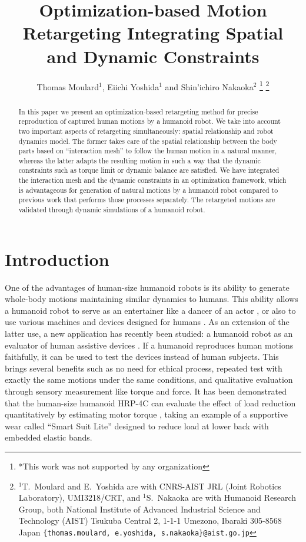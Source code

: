 \documentclass[letterpaper, 10 pt, conference]{ieeeconf}  %
\title{\LARGE \bf
Optimization-based Motion Retargeting Integrating Spatial and Dynamic Constraints
}
\author{Thomas Moulard$^{1}$, Eiichi Yoshida$^{1}$ and Shin'ichiro
  Nakaoka$^{2}$%
\thanks{*This work was not supported by any organization}%
\thanks{$^{1}$T.~Moulard and E.~Yoshida are with CNRS-AIST JRL (Joint
  Robotics Laboratory), UMI3218/CRT, and $^{1}$S.~Nakaoka are with
  Humanoid Research Group, both National Institute of Advanced Industrial Science and Technology (AIST)
Tsukuba Central 2, 1-1-1 Umezono, Ibaraki 305-8568 Japan
        {\tt\footnotesize \{thomas.moulard, e.yoshida, s.nakaoka\}@aist.go.jp}}%
}
\begin{document}
\maketitle
\thispagestyle{empty}
\pagestyle{empty}


\begin{abstract}
In this paper we present an optimization-based retargeting method for
precise reproduction of captured human motions by a humanoid robot.
We take into account two important aspects of retargeting
simultaneously: spatial relationship and robot dynamics model.
The former takes care of the spatial relationship between the body
parts based on ``interaction mesh'' to follow the human motion in a
natural manner, whereas the latter adapts the resulting motion in such
a way that the dynamic constraints such as torque limit or dynamic
balance are satisfied.
We have integrated the interaction mesh and the dynamic constraints in an
optimization framework, which is advantageous for generation of
natural motions by a humanoid robot compared to
previous work that performs those processes separately. The retargeted
motions are validated through dynamic simulations of a humanoid robot.
\end{abstract}


\section{Introduction}
\label{sec:intro}

One of the advantages of human-size humanoid robots is
its ability to generate whole-body motions maintaining similar
dynamics to humans.
This ability allows a humanoid robot to serve as an entertainer like
a dancer of an actor \cite{nakaoka_iros2010}, or also to use various
machines and devices designed for humans \cite{Yokoi03iros}.
As an extension of the latter use, a new application
has recently been studied: a humanoid robot as an evaluator of human
assistive devices \cite{Takanishi06ICRA,Miura13ICRA}.
If a humanoid reproduces human motions faithfully, it can be used to
test the devices instead of human subjects.
This brings several benefits such as no need for ethical
process, repeated test with exactly the same motions under the same
conditions, and qualitative evaluation through sensory measurement
like torque and force.
It has been demonstrated that the human-size humanoid HRP-4C
\cite{Kaneko09Humanoids}  can evaluate the effect of load reduction
quantitatively by estimating motor torque \cite{Miura13ICRA}, taking
an example of a supportive wear called ``Smart Suit Lite''
\cite{Tanaka11JRM} designed to reduce load
at lower back with embedded elastic bands.
\end{document}
